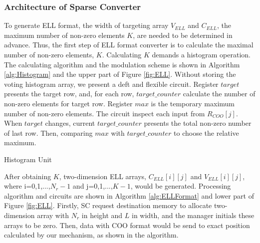 \documentclass[10pt,journal,compsoc]{IEEEtran}
\begin{document}
\subsubsection{Architecture of Sparse Converter}
To generate ELL format, the width of targeting array $ V_{ELL} $ and $ C_{ELL} $, the maximum number of non-zero elements $ K $, are needed to be determined in advance.
Thus, the first step of ELL format converter is to calculate the maximal number of non-zero elements, $ K $. Calculating $ K $
demands a histogram operation. The calculating algorithm and the modulation scheme is shown in Algorithm \ref{alg:Histogram}
and the upper part of Figure \ref{fig:ELL}.
Without storing the voting histogram array,
we present a deft and flexible circuit. Register $ target $ presents the target row, and, for each row, $ target\_counter $ calculate the number of non-zero elements for target row.
Register $ max $ is the temporary maximum number of non-zero elements.  The circuit inspect each input from $ R_{COO}[j] $.
When $target $ changes, current $ target\_counter $ presents the total non-zero number of last row. Then, comparing $ max $ with $ target\_counter $ to choose the relative maximum.

\begin{algorithm}  [t]
\footnotesize
{}


\caption{Histogram Unit  }
\label{alg:Histogram}
\end{algorithm}


After obtaining $ K $, two-dimension ELL arrays, $ C_{ELL}[i][j] $ and $ V_{ELL}[i][j] $, where i=0,1,...,$ N_{r}-1 $ and j=0,1,...,$  K-1 $, would be generated. Processing algorithm and circuits are shown in Algorithm \ref{alg:ELLFormat} and lower part of Figure \ref{fig:ELL}. Firstly, SC request destination memory to allocate two-dimension array with $N_{r}$ in height and $L$ in width, and the manager initials these arrays to be zero. Then, data with COO format would be send to exact position calculated by our mechanism, as shown in the algorithm.
\end{document}
